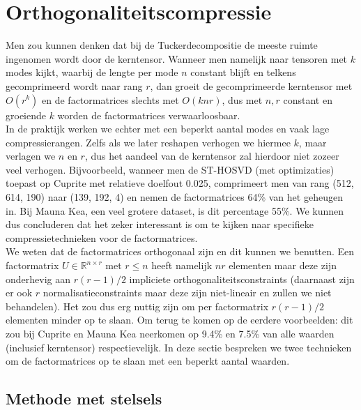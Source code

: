 \section{Orthogonaliteitscompressie}

Men zou kunnen denken dat bij de Tuckerdecompositie de meeste ruimte ingenomen wordt door de kerntensor. Wanneer men namelijk naar tensoren met $k$ modes kijkt, waarbij de lengte per mode $n$ constant blijft en telkens gecomprimeerd wordt naar rang $r$, dan groeit de gecomprimeerde kerntensor met $O(r^k)$ en de factormatrices slechts met $O(knr)$, dus met $n, r$ constant en groeiende $k$ worden de factormatrices verwaarloosbaar.\\

In de praktijk werken we echter met een beperkt aantal modes en vaak lage compressierangen. Zelfs als we later reshapen verhogen we hiermee $k$, maar verlagen we $n$ en $r$, dus het aandeel van de kerntensor zal hierdoor niet zozeer veel verhogen. Bijvoorbeeld, wanneer men de ST-HOSVD (met optimizaties) toepast op Cuprite met relatieve doelfout 0.025, comprimeert men van rang (512, 614, 190) naar (139, 192, 4) en nemen de factormatrices 64\% van het geheugen in. Bij Mauna Kea, een veel grotere dataset, is dit percentage 55\%. We kunnen dus concluderen dat het zeker interessant is om te kijken naar specifieke compressietechnieken voor de factormatrices.\\

We weten dat de factormatrices orthogonaal zijn en dit kunnen we benutten. Een factormatrix $U \in \mathbb{R}^{n \times r}$ met $r \leq n$ heeft namelijk $nr$ elementen maar deze zijn onderhevig aan $r(r - 1)/2$ impliciete orthogonaliteitsconstraints (daarnaast zijn er ook $r$ normalisatieconstraints maar deze zijn niet-lineair en zullen we niet behandelen). Het zou dus erg nuttig zijn om per factormatrix $r(r - 1)/2$ elementen minder op te slaan. Om terug te komen op de eerdere voorbeelden: dit zou bij Cuprite en Mauna Kea neerkomen op 9.4\% en 7.5\% van alle waarden (inclusief kerntensor) respectievelijk. In deze sectie bespreken we twee technieken om de factormatrices op te slaan met een beperkt aantal waarden.

\subsection{Methode met stelsels}


